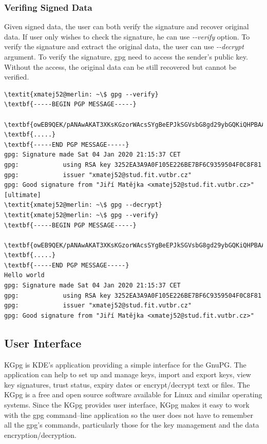 \subsubsection*{Verifing Signed Data}
Given signed data, the user can both verify the signature and recover original data. If user only wishes to check the signature, he can use {\textit{-{}-verify}} option. To verify the signature and extract the original data, the user can use {\textit{-{}-decrypt}} argument. To verify the signature, gpg need to access the sender's public key. Without the access, the original data can be still recovered but cannot be verified.
\begin{Verbatim}[commandchars=\\\{\},codes={\catcode`$=3\catcode`_=8},samepage=false,frame=single]
\textit{xmatej52@merlin: ~\$ gpg --verify}
\textbf{-----BEGIN PGP MESSAGE-----}

\textbf{owEB9QEK/pANAwAKAT3XKsKGzorWAcsSYgBeEPJkSGVsbG8gd29ybGQKiQHPBAAB}
\textbf{.....}
\textbf{-----END PGP MESSAGE-----}
gpg: Signature made Sat 04 Jan 2020 21:15:37 CET
gpg:            using RSA key 3252EA3A9A0F105E226BE7BF6C9359504F0C8F81
gpg:            issuer "xmatej52@stud.fit.vutbr.cz"
gpg: Good signature from "Jiří Matějka <xmatej52@stud.fit.vutbr.cz>"
[ultimate]
\textit{xmatej52@merlin: ~\$ gpg --decrypt}
\textit{xmatej52@merlin: ~\$ gpg --verify}
\textbf{-----BEGIN PGP MESSAGE-----}

\textbf{owEB9QEK/pANAwAKAT3XKsKGzorWAcsSYgBeEPJkSGVsbG8gd29ybGQKiQHPBAAB}
\textbf{.....}
\textbf{-----END PGP MESSAGE-----}
Hello world
gpg: Signature made Sat 04 Jan 2020 21:15:37 CET
gpg:            using RSA key 3252EA3A9A0F105E226BE7BF6C9359504F0C8F81
gpg:            issuer "xmatej52@stud.fit.vutbr.cz"
gpg: Good signature from "Jiří Matějka <xmatej52@stud.fit.vutbr.cz>"
\end{Verbatim}
\subsection{User Interface}
KGpg is KDE's application providing a simple interface for the GnuPG. The application can help to set up and manage keys, import and export keys, view key signatures, trust status, expiry dates or encrypt/decrypt text or files. The KGpg is a free and open source software available for Linux and similar operating systems. Since the KGpg provides user interface, KGpg makes it easy to work with the gpg command--line application so the user does not have to remember all the gpg's commands, particularly those for the key management and the data encryption/decryption.

